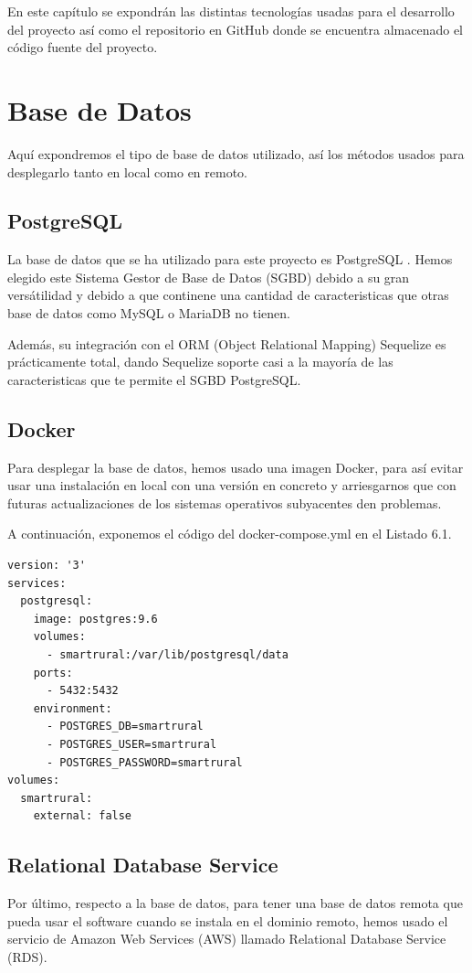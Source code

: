 En este capítulo se expondrán las distintas tecnologías usadas para el desarrollo del proyecto así como el repositorio en GitHub donde se encuentra almacenado el código fuente del proyecto.

\newpage

\section{Base de Datos}
Aquí expondremos el tipo de base de datos utilizado, así los métodos usados para desplegarlo tanto en local como en remoto.

\subsection{PostgreSQL}
La base de datos que se ha utilizado para este proyecto es PostgreSQL \cite{postgresql}. Hemos elegido este Sistema Gestor de Base de Datos (SGBD) debido a su gran versátilidad y debido a que continene una cantidad de caracteristicas que otras base de datos como MySQL \cite{mysql} o MariaDB \cite{mariadb} no tienen.

Además, su integración con el ORM (Object Relational Mapping) Sequelize \cite{sequelize} es prácticamente total, dando Sequelize soporte casi a la mayoría de las caracteristicas que te permite el SGBD PostgreSQL.

\subsection{Docker}
Para desplegar la base de datos, hemos usado una imagen Docker, para así evitar usar una instalación en local con una versión en concreto y arriesgarnos que con futuras actualizaciones de los sistemas operativos subyacentes den problemas.

A continuación, exponemos el código del docker-compose.yml en el Listado 6.1.

\begin{lstlisting}[language=XML,caption={docker-compose.yml},captionpos=b]
version: '3'
services:
  postgresql:
    image: postgres:9.6
    volumes:
      - smartrural:/var/lib/postgresql/data
    ports:
      - 5432:5432
    environment:
      - POSTGRES_DB=smartrural
      - POSTGRES_USER=smartrural
      - POSTGRES_PASSWORD=smartrural
volumes:
  smartrural:
    external: false
\end{lstlisting}

\subsection{Relational Database Service}
Por último, respecto a la base de datos, para tener una base de datos remota que pueda usar el software cuando se instala en el dominio remoto, hemos usado el servicio de Amazon Web Services (AWS) llamado Relational Database Service (RDS).

